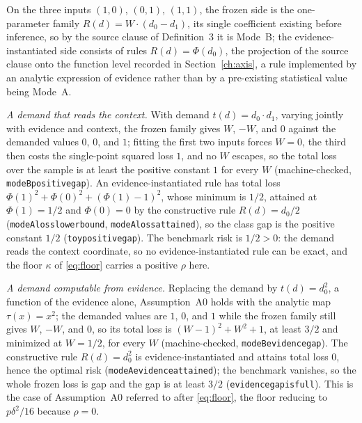 \begin{example}
\label{ex:gap}
On the three inputs $(1,0)$, $(0,1)$, $(1,1)$, the frozen side is the one-parameter family $R(d) = W \cdot (d_0 - d_1)$, its single coefficient existing before inference, so by the source clause of Definition~3 it is Mode~B; the evidence-instantiated side consists of rules $R(d) = \Phi(d_0)$, the projection of the source clause onto the function level recorded in Section~\ref{ch:axis}, a rule implemented by an analytic expression of evidence rather than by a pre-existing statistical value being Mode~A.

\emph{A demand that reads the context.} With demand $t(d) = d_0 \cdot d_1$, varying jointly with evidence and context, the frozen family gives $W$, $-W$, and $0$ against the demanded values $0$, $0$, and $1$; fitting the first two inputs forces $W = 0$, the third then costs the single-point squared loss $1$, and no $W$ escapes, so the total loss over the sample is at least the positive constant $1$ for every $W$ (machine-checked, \texttt{modeB\ttu positive\ttu gap}). An evidence-instantiated rule has total loss $\Phi(1)^2 + \Phi(0)^2 + (\Phi(1) - 1)^2$, whose minimum is $1/2$, attained at $\Phi(1) = 1/2$ and $\Phi(0) = 0$ by the constructive rule $R(d) = d_0/2$ (\texttt{modeA\ttu loss\ttu lower\ttu bound}, \texttt{modeA\ttu loss\ttu attained}), so the class gap is the positive constant $1/2$ (\texttt{toy\ttu positive\ttu gap}). The benchmark risk is $1/2 > 0$: the demand reads the context coordinate, so no evidence-instantiated rule can be exact, and the floor $\kappa$ of \eqref{eq:floor} carries a positive $\rho$ here.

\emph{A demand computable from evidence.} Replacing the demand by $t(d) = d_0^2$, a function of the evidence alone, Assumption~A0 holds with the analytic map $\tau(x) = x^2$; the demanded values are $1$, $0$, and $1$ while the frozen family still gives $W$, $-W$, and $0$, so its total loss is $(W - 1)^2 + W^2 + 1$, at least $3/2$ and minimized at $W = 1/2$, for every $W$ (machine-checked, \texttt{modeB\ttu evidence\ttu gap}). The constructive rule $R(d) = d_0^2$ is evidence-instantiated and attains total loss $0$, hence the optimal risk (\texttt{modeA\ttu evidence\ttu attained}); the benchmark vanishes, so the whole frozen loss is gap and the gap is at least $3/2$ (\texttt{evidence\ttu gap\ttu is\ttu full}). This is the case of Assumption~A0 referred to after \eqref{eq:floor}, the floor reducing to $p \delta^2 / 16$ because $\rho = 0$.
\end{example}

